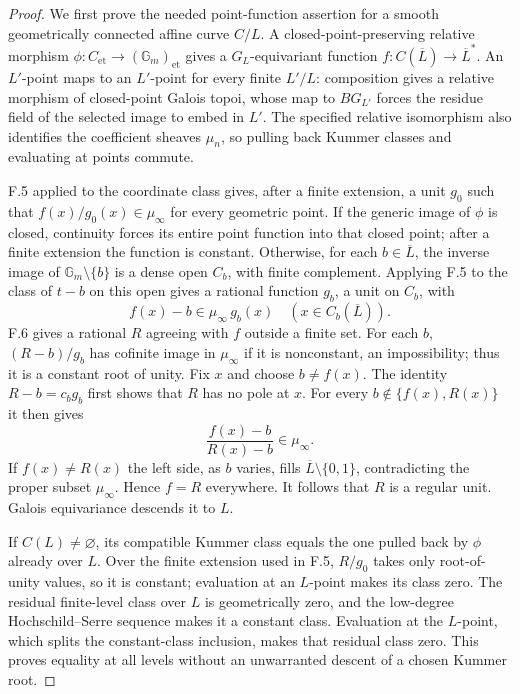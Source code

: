 \begin{proof}
We first prove the needed point-function assertion for a smooth
geometrically connected affine curve $C/L$. A closed-point-preserving
relative morphism
$\phi:C_{\mathrm{et}}\to(\mathbb G_m)_{\mathrm{et}}$ gives a
$G_L$-equivariant function $f:C(\overline L)\to\overline L^*$.
An $L'$-point maps to an $L'$-point for every finite $L'/L$:
composition gives a relative morphism of closed-point Galois topoi,
whose map to $B G_{L'}$ forces the residue field of the selected
image to embed in $L'$. The specified relative isomorphism also
identifies the coefficient sheaves $\mu_n$, so pulling back Kummer
classes and evaluating at points commute.

F.5 applied to the coordinate class gives, after a finite extension,
a unit $g_0$ such that $f(x)/g_0(x)\in\mu_\infty$ for every
geometric point. If the generic image of $\phi$ is closed,
continuity forces its entire point function into that closed point;
after a finite extension the function is constant. Otherwise, for
each $b\in\overline L$, the inverse image of
$\mathbb G_m\setminus\{b\}$ is a dense open $C_b$, with finite
complement. Applying F.5 to the class of $t-b$ on this open gives
a rational function $g_b$, a unit on $C_b$, with
\[
f(x)-b\in\mu_\infty\, g_b(x) \quad(x\in C_b(\overline L)).
\]
F.6 gives a rational $R$ agreeing with $f$ outside a finite set.
For each $b$, $(R-b)/g_b$ has cofinite image in $\mu_\infty$ if
it is nonconstant, an impossibility; thus it is a constant root of
unity. Fix $x$ and choose $b\ne f(x)$. The identity $R-b=c_b g_b$
first shows that $R$ has no pole at $x$. For every
$b\notin\{f(x),R(x)\}$ it then gives
\[
 \frac{f(x)-b}{R(x)-b}\in\mu_\infty.
\]
If $f(x)\ne R(x)$ the left side, as $b$ varies, fills
$\overline L\setminus\{0,1\}$, contradicting the proper subset
$\mu_\infty$. Hence $f=R$ everywhere. It follows that $R$ is a
regular unit. Galois equivariance descends it to $L$.

If $C(L)\ne\varnothing$, its compatible Kummer class equals the
one pulled back by $\phi$ already over $L$. Over the finite
extension used in F.5, $R/g_0$ takes only root-of-unity values,
so it is constant; evaluation at an $L$-point makes its class zero.
The residual finite-level class over $L$ is geometrically zero,
and the low-degree Hochschild--Serre sequence makes it a constant
class. Evaluation at the $L$-point, which splits the constant-class
inclusion, makes that residual class zero. This proves equality at
all levels without an unwarranted descent of a chosen Kummer root.


\end{proof}
